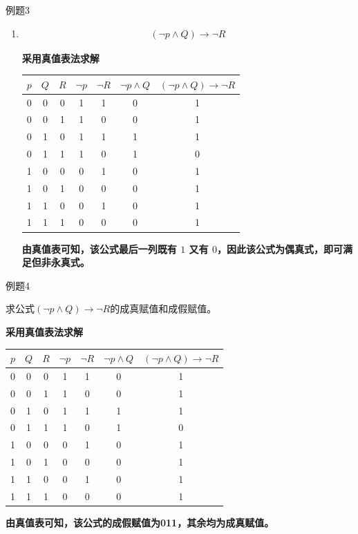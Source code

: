 \begin{question}{例题3}
\begin{enumerate}
		
		\item 
		\begin{align*}
			(\neg p \land Q) \to \neg R
		\end{align*}
		
		\textbf{采用真值表法求解}
		\begin{center}
			\begin{tabular}{ccccccc}
				\toprule
				$p$ & $Q$ & $R$ & $\neg p$ & $\neg R$ & $\neg p\land Q$ & $(\neg p\land Q)\to\neg R$ \\
				\midrule
				0 & 0 & 0 & 1 & 1 & 0 & 1 \\
				0 & 0 & 1 & 1 & 0 & 0 & 1 \\
				0 & 1 & 0 & 1 & 1 & 1 & 1 \\
				0 & 1 & 1 & 1 & 0 & 1 & 0 \\
				1 & 0 & 0 & 0 & 1 & 0 & 1 \\
				1 & 0 & 1 & 0 & 0 & 0 & 1 \\
				1 & 1 & 0 & 0 & 1 & 0 & 1 \\
				1 & 1 & 1 & 0 & 0 & 0 & 1 \\
				\bottomrule
			\end{tabular}
		\end{center}
		
		\textbf{由真值表可知，该公式最后一列既有 $1$ 又有 $0$，因此该公式为偶真式，即可满足但非永真式。}
		
		
	\end{enumerate}
\end{question}

\begin{question}{例题4}
	
	求公式$(\neg p \land Q) \to \neg R$的成真赋值和成假赋值。
	
	\textbf{采用真值表法求解}
	\begin{center}
		\begin{tabular}{ccccccc}
			\toprule
			$p$ & $Q$ & $R$ & $\neg p$ & $\neg R$ & $\neg p\land Q$ & $(\neg p\land Q)\to\neg R$ \\
			\midrule
			0 & 0 & 0 & 1 & 1 & 0 & 1 \\
			0 & 0 & 1 & 1 & 0 & 0 & 1 \\
			0 & 1 & 0 & 1 & 1 & 1 & 1 \\
			0 & 1 & 1 & 1 & 0 & 1 & 0 \\
			1 & 0 & 0 & 0 & 1 & 0 & 1 \\
			1 & 0 & 1 & 0 & 0 & 0 & 1 \\
			1 & 1 & 0 & 0 & 1 & 0 & 1 \\
			1 & 1 & 1 & 0 & 0 & 0 & 1 \\
			\bottomrule
		\end{tabular}
	\end{center}
	
	\textbf{由真值表可知，该公式的成假赋值为011，其余均为成真赋值。}
	
\end{question}